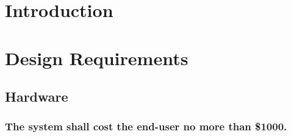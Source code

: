 \documentclass[12pt]{report}
\begin{document}
\normalem

{\tableofcontents\let\clearpage\relax\listoffigures\let\clearpage\relax\listoftables}
\clearpage
\newpage




\section{Introduction}
\section{Design Requirements}
\subsection{Hardware}
\subsubsection{The system shall cost the end-user no more than \$1000.}
\end{document}
